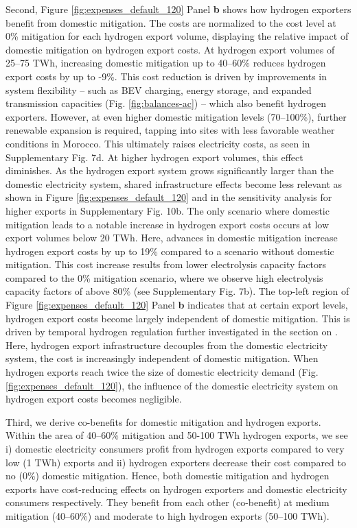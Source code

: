 Second, Figure \ref{fig:expenses_default_120} Panel \textbf{b} shows how hydrogen exporters benefit from domestic \co mitigation.
The costs are normalized to the cost level at 0\% \co mitigation for each hydrogen export volume, displaying the relative impact of domestic \co mitigation on hydrogen export costs.
At hydrogen export volumes of 25--75 TWh, increasing domestic \co mitigation up to 40–60\% reduces hydrogen export costs by up to -9\%. 
This cost reduction is driven by improvements in system flexibility -- such as BEV charging, energy storage, and expanded transmission capacities (Fig. \ref{fig:balances-ac}) -- which also benefit hydrogen exporters.
However, at even higher domestic \co mitigation levels (70--100\%), further renewable expansion is required, tapping into sites with less favorable weather conditions in Morocco. This ultimately raises electricity costs, as seen in Supplementary Fig. 7d. %
At higher hydrogen export volumes, this effect diminishes. As the hydrogen export system grows significantly larger than the domestic electricity system, shared infrastructure effects become less relevant 
as shown in Figure \ref{fig:expenses_default_120} and in the sensitivity analysis for higher exports in Supplementary Fig. 10b. %
The only scenario where domestic \co mitigation leads to a notable increase in hydrogen export costs occurs at low export volumes below 20 TWh. Here, advances in domestic \co mitigation increase hydrogen export costs by up to 19\% compared to a scenario without domestic \co mitigation. 
This cost increase results from lower electrolysis capacity factors compared to the 0\% \co mitigation scenario, where we observe high electrolysis capacity factors of above 80\% (see Supplementary Fig. 7b). %
The top-left region of Figure \ref{fig:expenses_default_120} Panel \textbf{b} indicates that at certain export levels, hydrogen export costs become largely independent of domestic \co mitigation. This is driven by temporal hydrogen regulation further investigated in the section on . Here, hydrogen export infrastructure decouples from the domestic electricity system, the cost is increasingly independent of domestic \co mitigation.
When hydrogen exports reach twice the size of domestic electricity demand (Fig. \ref{fig:expenses_default_120}), the influence of the domestic electricity system on hydrogen export costs becomes negligible.


Third, we derive co-benefits for domestic \co mitigation and hydrogen exports. 
Within the area of 40--60\% \co mitigation and 50-100 TWh hydrogen exports, we see i) domestic electricity consumers profit from hydrogen exports compared to very low (1 TWh) exports and ii) hydrogen exporters decrease their cost compared to no (0\%) domestic \co mitigation. 
Hence, both domestic \co mitigation and hydrogen exports have cost-reducing effects on hydrogen exporters and domestic electricity consumers respectively. They benefit from each other (co-benefit) at medium mitigation (40--60\%) and moderate to high hydrogen exports (50--100 TWh). 

